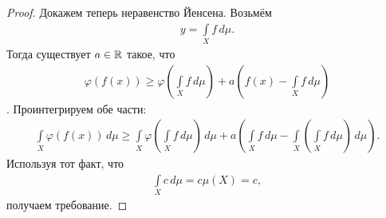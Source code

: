 \begin{proof}
 Докажем теперь неравенство Йенсена. Возьмём \begin{align*}
  y = \int\limits_{X} f \, d\mu  
 .\end{align*} Тогда существует $a \in \mathbb{R}$ такое, что \begin{align*}
  \varphi(f(x)) \geqslant \varphi \left( \int\limits_{X} f \, d\mu   \right) + a \left( f(x) - \int\limits_{X} f \, d\mu   \right)
 \end{align*}. Проинтегрируем обе части: \begin{align*}
  \int\limits_{X} \varphi(f(x)) \, d\mu   \geqslant \int\limits_{X} \varphi \left( \int\limits_{X} f \, d\mu   \right) \, d\mu  + a \left( \int\limits_{X} f \, d\mu - \int\limits_{X} \left( \int\limits_{X} f \, d\mu   \right) \, d\mu    \right)
 .\end{align*} Используя тот факт, что \begin{align*}
  \int\limits_{X} c \, d\mu  = c \mu(X) = c
 ,\end{align*} получаем требование.
\end{proof}
